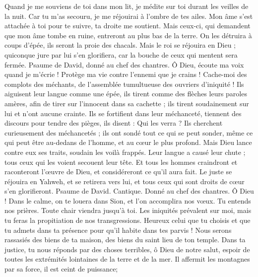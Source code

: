 \begin{multicols}{2}
Quand je me souviens de toi dans mon lit, je médite sur toi durant les veilles de la nuit.
Car tu m'as secouru, je me réjouirai à l'ombre de tes ailes.
Mon âme s'est attachée à toi pour te suivre, ta droite me soutient.
Mais ceux-ci, qui demandent que mon âme tombe en ruine, entreront au plus bas de la terre.
On les détruira à coups d'épée, ils seront la proie des chacals.
Mais le roi se réjouira en Dieu ; quiconque jure par lui s'en glorifiera, car la bouche de ceux qui mentent sera fermée.
\VerseOne{}Psaume de David, donné au chef des chantres.
Ô Dieu, écoute ma voix quand je m'écrie ! Protège ma vie contre l'ennemi que je crains !
Cache-moi des complots des méchants, de l'assemblée tumultueuse des ouvriers d'iniquité !
Ils aiguisent leur langue comme une épée, ils tirent comme des flèches leurs paroles amères,
afin de tirer sur l'innocent dans sa cachette ; ils tirent soudainement sur lui et n'ont aucune crainte.
Ils se fortifient dans leur méchanceté, tiennent des discours pour tendre des pièges, ils disent : Qui les verra ?
Ils cherchent curieusement des méchancetés ; ils ont sondé tout ce qui se peut sonder, même ce qui peut être au-dedans de l'homme, et au cœur le plus profond.
Mais Dieu lance contre eux ses traits, soudain les voilà frappés.
Leur langue a causé leur chute ; tous ceux qui les voient secouent leur tête.
Et tous les hommes craindront et raconteront l'œuvre de Dieu, et considéreront ce qu'il aura fait.
Le juste se réjouira en Yahweh, et se retirera vers lui, et tous ceux qui sont droits de cœur s'en glorifieront.
\VerseOne{}Psaume de David. Cantique. Donné au chef des chantres.
Ô Dieu ! Dans le calme, on te louera dans Sion, et l'on accomplira nos vœux.
Tu entends nos prières. Toute chair viendra jusqu'à toi.
Les iniquités prévalent sur moi, mais tu feras la propitiation de nos transgressions.
Heureux celui que tu choisis et que tu admets dans ta présence pour qu'il habite dans tes parvis ! Nous serons rassasiés des biens de ta maison, des biens du saint lieu de ton temple.
Dans ta justice, tu nous réponds par des choses terribles, ô Dieu de notre salut, espoir de toutes les extrémités lointaines de la terre et de la mer.
Il affermit les montagnes par sa force, il est ceint de puissance;

\end{multicols}
